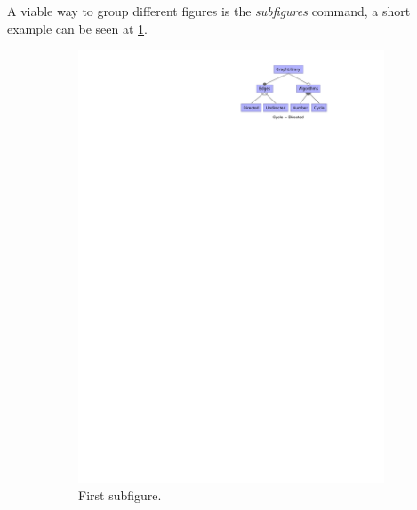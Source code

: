 A viable way to group different figures is the \textit{subfigures} command, a short example can be seen at \cref{fig:first}.

\begin{figure}
   \begin{subfigure}{0.33\linewidth}
      \includegraphics[width=\linewidth]{img/example.pdf}
      \caption{First subfigure.}
      \label{fig:first}
  \end{subfigure}\hfill
  \begin{subfigure}{0.33\linewidth}

\end{subfigure}
\end{figure}
